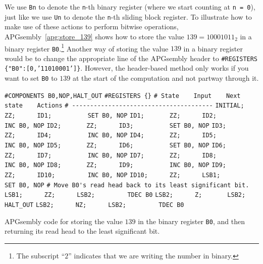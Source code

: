 We use \texttt{Bn} to denote the \texttt{n}-th binary register (where we start counting at \texttt{n = 0}), just like we use \texttt{Un} to denote the \texttt{n}-th sliding block register. To illustrate how to make use of these actions to perform bitwise operations, APGsembly~\ref{apg:store_139} shows how to store the value $139 = 10001011_2$ in a binary register \texttt{B0}.\footnote{The subscript ``$2$'' indicates that we are writing the number in binary.} Another way of storing the value $139$ in a binary register would be to change the appropriate line of the APGsembly header to \texttt{\#REGISTERS \{"B0":[0,'11010001']\}}. However, the header-based method only works if you want to set \texttt{B0} to $139$ at the start of the computation and not partway through it.

\begin{apgsembly}
	\begin{algorithmic}\small
		\State \verb|#COMPONENTS B0,NOP,HALT_OUT|
		\State \verb|#REGISTERS {}|
		\State \verb|# State    Input    Next state    Actions|
		\State \verb|# ---------------------------------------|
		\State \verb|INITIAL;   ZZ;      ID1;          SET B0, NOP|
		\State \verb|ID1;       ZZ;      ID2;          INC B0, NOP|
		\State \verb|ID2;       ZZ;      ID3;          SET B0, NOP|
		\State \verb|ID3;       ZZ;      ID4;          INC B0, NOP|
		\State \verb|ID4;       ZZ;      ID5;          INC B0, NOP|
		\State \verb|ID5;       ZZ;      ID6;          SET B0, NOP|
		\State \verb|ID6;       ZZ;      ID7;          INC B0, NOP|
		\State \verb|ID7;       ZZ;      ID8;          INC B0, NOP|
		\State \verb|ID8;       ZZ;      ID9;          INC B0, NOP|
		\State \verb|ID9;       ZZ;      ID10;         INC B0, NOP|
		\State \verb|ID10;      ZZ;      LSB1;         SET B0, NOP|
		\State
		\State \verb|# Move B0's read head back to its least significant bit.|
		\State \verb|LSB1;      ZZ;      LSB2;         TDEC B0|
		\State \verb|LSB2;      Z;       LSB2;         HALT_OUT|
		\State \verb|LSB2;      NZ;      LSB2;         TDEC B0|
	\end{algorithmic}
	\caption{APGsembly code for storing the value $139$ in the binary register \texttt{B0}, and then returning its read head to the least significant bit.}\label{apg:store_139}
\end{apgsembly}

